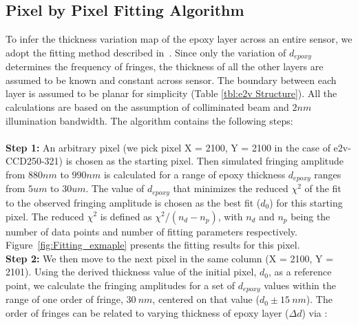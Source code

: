 \documentclass[twocolumn]{aastex63} %
\begin{document}
\begin{CJK*}{UTF8}{gbsn}
\subsection{Pixel by Pixel Fitting Algorithm}
To infer the thickness variation map of the epoxy layer across an entire sensor, we adopt the fitting method described in~\citet{Malumuth03}. Since only the variation of $d_{epoxy}$ determines the frequency of fringes, the thickness of all the other layers are assumed to be known and constant across sensor. The boundary between each layer is assumed to be planar for simplicity (Table \ref{tbl:e2v Structure}). All the calculations are based on the assumption of colliminated beam and $2nm$ illumination bandwidth.
The algorithm contains the following steps: \\ \\
\textbf{Step 1:} An arbitrary pixel (we pick pixel X = 2100, Y = 2100 in the case of e2v-CCD250-321) is chosen as the starting pixel. Then simulated fringing amplitude from $880nm$ to $990nm$ is calculated for a range of epoxy thickness $d_{epoxy}$ ranges from $5um$ to $30um$. The value of $d_{epoxy}$ that minimizes the reduced $\chi^2$ of the fit to the observed fringing amplitude is chosen as the best fit ($d_0$) for this starting pixel. The reduced $\chi^2$ is defined as ${\chi^2}$/${(n_d-n_p)}$, with $n_d$ and $n_p$ being the number of data points and number of fitting parameters respectively. Figure~\ref{fig:Fitting_exmaple} presents the fitting results for this pixel.\\
\textbf{Step 2:} We then move to the next pixel in the same column (X = 2100, Y = 2101). Using the derived thickness value of the initial pixel, $d_0$, as a reference point, we calculate the fringing amplitudes for a set of $d_{epoxy}$ values within the range of one order of fringe, $30\ nm$, centered on that value ($d_0\pm 15\ nm$). The order of fringes can be related to varying thickness of epoxy layer ($\Delta d$) via \citep{James87}:


\end{CJK*}
\end{document}
